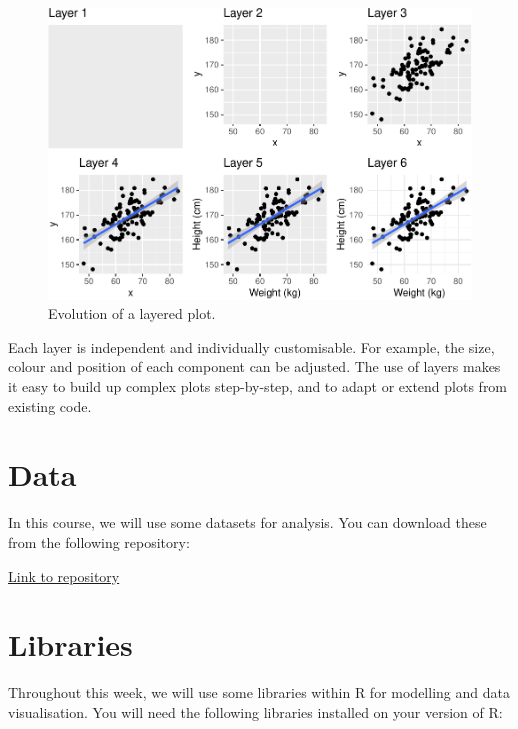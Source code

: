 \documentclass[
]{book}
\begin{document}
\begin{figure}[h]

{\centering \includegraphics[width=0.8\linewidth]{bookdown-demo_files/figure-latex/layerplot-1} 

}

\caption{\label{fig:layer} Evolution of a layered plot.}\label{fig:layerplot}
\end{figure}

Each layer is independent and individually customisable. For example, the size, colour and position of each component can be adjusted. The use of layers makes it easy to build up complex plots step-by-step, and to adapt or extend plots from existing code.

\hypertarget{data}{%
\section{Data}\label{data}}

In this course, we will use some datasets for analysis. You can download these from the following repository:

\href{https://github.com/craigalexander/IntroToRDataVis/tree/main/Data}{Link to repository}

\hypertarget{libraries}{%
\section{Libraries}\label{libraries}}

Throughout this week, we will use some libraries within R for modelling and data visualisation. You will need the following libraries installed on your version of R:
\end{document}
